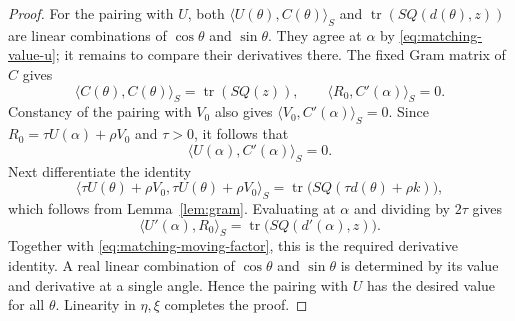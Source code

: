 \begin{proof}
For the pairing with $U$, both
$\langle U(\theta),C(\theta)\rangle_S$ and
$\operatorname{tr}(SQ(d(\theta),z))$ are linear combinations of
$\cos\theta$ and $\sin\theta$.  They agree at $\alpha$ by
\eqref{eq:matching-value-u}; it remains to compare their derivatives
there.  The fixed Gram matrix of $C$ gives
\[
 \langle C(\theta),C(\theta)\rangle_S
 =\operatorname{tr}(SQ(z)),
 \qquad
 \langle R_0,C'(\alpha)\rangle_S=0.
\]
Constancy of the pairing with $V_0$ also gives
$\langle V_0,C'(\alpha)\rangle_S=0$.  Since
$R_0=\tau U(\alpha)+\rho V_0$ and $\tau>0$, it follows that
\begin{equation}\label{eq:matching-moving-factor}
 \langle U(\alpha),C'(\alpha)\rangle_S=0.
\end{equation}
Next differentiate the identity
\[
 \langle\tau U(\theta)+\rho V_0,
          \tau U(\theta)+\rho V_0\rangle_S
 =\operatorname{tr}\bigl(SQ(\tau d(\theta)+\rho k)\bigr),
\]
which follows from Lemma~\ref{lem:gram}.  Evaluating at $\alpha$ and
dividing by $2\tau$ gives
\[
 \langle U'(\alpha),R_0\rangle_S
 =\operatorname{tr}\bigl(SQ(d'(\alpha),z)\bigr).
\]
Together with \eqref{eq:matching-moving-factor}, this is the required
derivative identity.  A real linear combination of $\cos\theta$ and
$\sin\theta$ is determined by its value and derivative at a single
angle.  Hence the pairing with $U$ has the desired value for all
$\theta$.  Linearity in $\eta,\xi$ completes the proof.
\end{proof}
